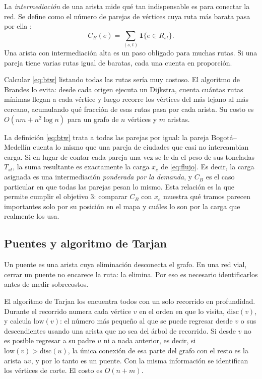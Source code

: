 \documentclass[conference]{IEEEtran}
\begin{document}
La \emph{intermediación} de una arista mide qué tan indispensable es para
conectar la red. Se define como el número de parejas de vértices cuya ruta más
barata pasa por ella \cite{brandes2001}:
\begin{equation}\label{eq:btw}
C_B(e)=\sum_{(s,t)} \mathbf{1}\{e\in R_{st}\}.
\end{equation}
Una arista con intermediación alta es un paso obligado para muchas rutas. Si una
pareja tiene varias rutas igual de baratas, cada una cuenta en proporción.

Calcular \eqref{eq:btw} listando todas las rutas sería muy costoso. El algoritmo
de Brandes \cite{brandes2001} lo evita: desde cada origen ejecuta un Dijkstra,
cuenta cuántas rutas mínimas llegan a cada vértice y luego recorre los vértices
del más lejano al más cercano, acumulando qué fracción de esas rutas pasa por
cada arista. Su costo es $O(nm+n^2\log n)$ para un grafo de $n$ vértices y $m$
aristas.

La definición \eqref{eq:btw} trata a todas las parejas por igual: la pareja
Bogotá--Medellín cuenta lo mismo que una pareja de ciudades que casi no
intercambian carga. Si en lugar de contar cada pareja una vez se le da el peso
de sus toneladas $T_{st}$, la suma resultante es exactamente la carga $x_e$ de
\eqref{eq:flujo}. Es decir, la carga asignada es una intermediación
\emph{ponderada por la demanda}, y $C_B$ es el caso particular en que todas las
parejas pesan lo mismo. Esta relación es la que permite cumplir el objetivo 3:
comparar $C_B$ con $x_e$ muestra qué tramos parecen importantes solo por su
posición en el mapa y cuáles lo son por la carga que realmente los usa.

\subsection{Puentes y algoritmo de Tarjan}
\label{sub:tarjan}

Un puente es una arista cuya eliminación desconecta el grafo. En una red vial,
cerrar un puente no encarece la ruta: la elimina. Por eso es necesario
identificarlos antes de medir sobrecostos.

El algoritmo de Tarjan \cite{tarjan1972} los encuentra todos con un solo
recorrido en profundidad. Durante el recorrido numera cada vértice $v$ en el
orden en que lo visita, $\text{disc}(v)$, y calcula $\text{low}(v)$: el número
más pequeño al que se puede regresar desde $v$ o sus descendientes usando una
arista que no sea del árbol de recorrido. Si desde $v$ no es posible regresar a
su padre $u$ ni a nada anterior, es decir, si
$\text{low}(v)>\text{disc}(u)$, la única conexión de esa parte del grafo con el
resto es la arista $uv$, y por lo tanto es un puente. Con la misma información
se identifican los vértices de corte. El costo es $O(n+m)$.
\end{document}
